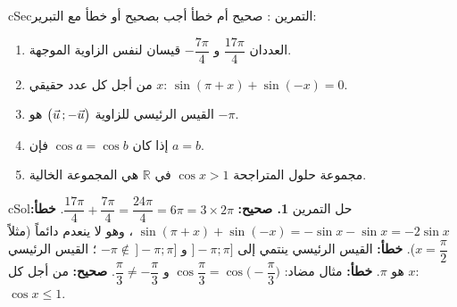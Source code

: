 \documentclass[12pt,a4paper]{article}
\newenvironment{BOX}[2]{\begin{otherlanguage}{english}\begin{arbox}{#1}{#2}}{\end{arbox}\end{otherlanguage}}
\newcounter{exo}
\newenvironment{tamrin}[1]{\stepcounter{exo}\begin{BOX}{cSec}{التمرين \theexo: #1}}{\end{BOX}}
\newenvironment{hal}{\Needspace{12\baselineskip}\begin{otherlanguage}{english}\begin{arbox}[breakable]{cSol}{حل التمرين \theexo}}{\end{arbox}\end{otherlanguage}}
\newcommand{\R}{\mathbb{R}}
\begin{document}
\begin{tamrin}{صحيح أم خطأ}
أجب بصحيح أو خطأ مع التبرير:
\begin{enumerate}
\item العددان $\dfrac{17\pi}{4}$ و $-\dfrac{7\pi}{4}$ قيسان لنفس الزاوية الموجهة.
\item من أجل كل عدد حقيقي $x$: $\sin(\pi+x)+\sin(-x)=0$.
\item القيس الرئيسي للزاوية $\big(\vec u\,;-\vec u\big)$ هو $-\pi$.
\item إذا كان $\cos a=\cos b$ فإن $a=b$.
\item مجموعة حلول المتراجحة $\cos x>1$ في $\R$ هي المجموعة الخالية.
\end{enumerate}
\end{tamrin}
\begin{hal}
\textbf{1. صحيح:} $\dfrac{17\pi}{4}+\dfrac{7\pi}{4}=\dfrac{24\pi}{4}=6\pi=3\times2\pi$.
 \textbf{خطأ:} $\sin(\pi+x)+\sin(-x)=-\sin x-\sin x=-2\sin x$ ، وهو لا ينعدم دائماً (مثلاً $x=\dfrac{\pi}{2}$).
 \textbf{خطأ:} القيس الرئيسي ينتمي إلى $]-\pi;\pi]$ و $-\pi\notin\,]-\pi;\pi]$ ؛ القيس الرئيسي هو $\pi$.
 \textbf{خطأ:} مثال مضاد: $\cos\dfrac{\pi}{3}=\cos\Big(-\dfrac{\pi}{3}\Big)$ و $\dfrac{\pi}{3}\ne-\dfrac{\pi}{3}$.
 \textbf{صحيح:} من أجل كل $x$: $\cos x\le1$.
\end{hal}
\end{document}
